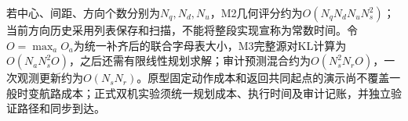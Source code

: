 若中心、间距、方向个数分别为$N_q,N_d,N_u$，M2几何评分约为$O(N_qN_dN_uN_s^2)$；当前方向历史采用列表保存和扫描，不能将整段实现宣称为常数时间。令$O=\max_a O_a$为统一补齐后的联合字母表大小，M3完整源对KL计算为$O(N_aN_s^2O)$，之后还需有限线性规划求解；审计预测混合约为$O(N_s^2N_rO)$，一次观测更新约为$O(N_sN_r)$。原型固定动作成本和返回共同起点的演示尚不覆盖一般时变航路成本；正式双机实验须统一规划成本、执行时间及审计记账，并独立验证路径和同步到达。
